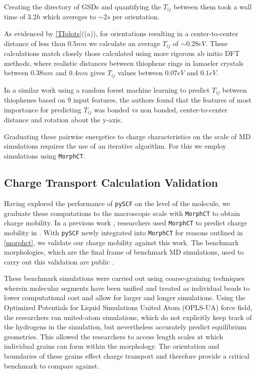 Creating the directory of GSDs and quantifying the $T_{ij}$ between them took a wall time of $3.2h$ which
avereges to ${\sim}2s$ per orientation. 

As evidenced by \autoref{TIplots}((a)), for orientations resulting in a center-to-center distance of less than
$0.5nm$ we calculate an average $T_{ij}$ of ${\sim} 0.28eV$.  
These calculations match closely those
calculated using more rigerous ab initio DFT methods\cite{Lan2008},
where realistic distances between thiophene rings in lamaeler  crystals 
between $0.38nm$ and $0.4 nm$ gives $T_{ij}$ values between $0.07eV$ and $0.1eV$. 

In a similar work using a random forest machine learning to predict $T_{ij}$
between thiophenes based on 9 input features, the authors found that the
features of most importance for predicting $T_{ij}$ was bonded vs non bonded,
center-to-center distance and rotation about the y-axis. \cite{Jankowski2019c}

Graduating these pairwise energetics to charge characteristics on the scale of MD simulations
requires the use of an iterative algorithm. For this we employ  simulations using \texttt{MorphCT}.

\subsection{Charge Transport Calculation Validation}

Having explored the performance of \texttt{pySCF} on the level of the molecule, we graduate these computations to the
macroscopic scale with \texttt{MorphCT} to obtain charge mobility.
In a previous work \cite{Miller2018}, researchers used \texttt{MorphCT} to predict charge mobility in . 
With \texttt{pySCF} newly integrated into \texttt{MorphCT} for reasons outlined in \autoref{morphct},
we validate our charge mobility against this work.
The benchmark morphologies, which are the final frame of benchmark MD simulations,
used to carry out this validation are public \cite{P3HTData}. 

These benchmark simulations were carried out using coarse-graining techniques
wherein molecular segments have been unified and treated as individual beads to lower
computational cost and allow for larger and longer simulations. 
Using the Optimized Potentials for Liquid Simulations United Atom (OPLS-UA) force field,
the researchers ran united-atom simulations, which do
not explicitly keep track of the hydrogens in the simulation, 
but nevertheless accurately predict equilibrium geometries. This allowed the researchers to access length scales
at which individual grains can form within the morphology. The orientation and boundaries of these grains effect
charge transport and therefore provide a critical benchmark to compare against. 

